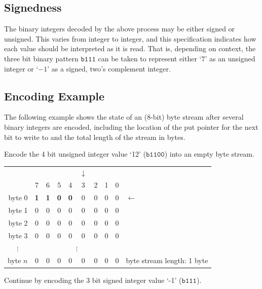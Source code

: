 \documentclass[11pt,letterpaper]{book}
\newcommand{\bin}[1]{\ensuremath{\mathtt{b#1}}}
\numberwithin{equation}{chapter}
\numberwithin{figure}{chapter}
\numberwithin{table}{chapter}
\begin{document}
\subsection{Signedness}

The binary integers decoded by the above process may be either signed or
 unsigned.
This varies from integer to integer, and this specification
 indicates how each value should be interpreted as it is read.
That is, depending on context, the three bit binary pattern \bin{111} can be
 taken to represent either `$7$' as an unsigned integer or `$-1$' as a signed,
 two's complement integer.

\subsection{Encoding Example}

The following example shows the state of an (8-bit) byte stream after several
 binary integers are encoded, including the location of the put pointer for the
 next bit to write to and the total length of the stream in bytes.

Encode the 4 bit unsigned integer value `12' (\bin{1100}) into an empty byte
 stream.

\begin{tabular}{r|ccccccccl}
\multicolumn{1}{r}{}& &&&&$\downarrow$&&&& \\
         & 7 & 6 & 5 & 4 & 3 & 2 & 1 & 0 & \\\cline{1-9}
byte 0   & \textbf{1} & \textbf{1} & \textbf{0} & \textbf{0} &
                           0 & 0 & 0 & 0 & $\leftarrow$     \\
byte 1   & 0 & 0 & 0 & 0 & 0 & 0 & 0 & 0 &                  \\
byte 2   & 0 & 0 & 0 & 0 & 0 & 0 & 0 & 0 &                  \\
byte 3   & 0 & 0 & 0 & 0 & 0 & 0 & 0 & 0 &                  \\
\multicolumn{1}{c|}{$\vdots$}&\multicolumn{8}{c}{$\vdots$}& \\
byte $n$ & 0 & 0 & 0 & 0 & 0 & 0 & 0 & 0 &
byte stream length: 1 byte
\end{tabular}
\vspace{\baselineskip}

Continue by encoding the 3 bit signed integer value `-1' (\bin{111}).
\end{document}
